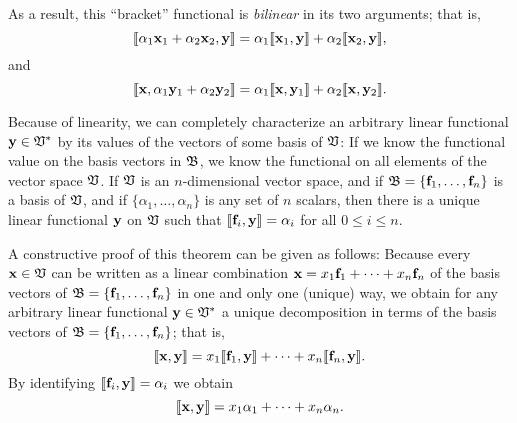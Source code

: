 As a result, this ``bracket'' functional is
{\em bilinear} in its two arguments; that is,
\begin{equation}
\llbracket  \alpha_1 {\bf x}_1 +\alpha_2 {\bf x}_2, {\bf y}\rrbracket
=
\alpha_1 \llbracket {\bf x}_1 ,{\bf y}\rrbracket   +\alpha_2  \llbracket {\bf x}_2,{\bf y}\rrbracket ,
\end{equation}
and
\begin{equation}
\llbracket
{\bf x}, \alpha_1 {\bf y}_1 +\alpha_2 {\bf y}_2
\rrbracket
=
\alpha_1
\llbracket {\bf x},{\bf y}_1 \rrbracket
+
\alpha_2
\llbracket {\bf x},{\bf y}_2\rrbracket .
\end{equation}


Because of linearity, we can completely characterize an arbitrary linear functional
${\bf y} \in {\frak V}^\ast $ by its values of the vectors of some basis of ${\frak V}$:
If we know the functional value on the basis vectors in ${\frak B}$, we know the functional
on all elements of the vector space ${\frak V}$.
If ${\frak V}$ is an $n$-dimensional vector space, and if ${\frak B} = \{{\bf f}_1,\ldots , {\bf f}_n\}$
is a basis of  ${\frak V}$, and if
$\{\alpha_1, \ldots ,\alpha_n\}$  is any set of $n$ scalars, then there is
a unique linear functional ${\bf y}$  on  ${\frak V}$ such that
$ \llbracket  {\bf f}_i, {\bf y}\rrbracket  = \alpha_i $ for all $0\le i \le n$.

{\color{OliveGreen}
\bproof
A constructive proof  of this theorem can be given as follows:
Because every ${\bf x}\in {\frak V}$
can be written as a linear combination $ {\bf x} = x_1 {\bf f}_1 +\cdots + x_n {\bf f}_n$
of the basis vectors of ${\frak B} = \{{\bf f}_1,\ldots , {\bf f}_n\}$
in one and only one (unique) way, we obtain for any arbitrary linear functional ${\bf y} \in {\frak V}^\ast $  a unique decomposition
in terms of the basis vectors of  ${\frak B} = \{{\bf f}_1,\ldots , {\bf f}_n\}$; that is,
\begin{equation}
\llbracket {\bf x},{\bf y}\rrbracket
=
x_1 \llbracket {\bf f}_1 ,{\bf y}\rrbracket  +\cdots + x_n \llbracket {\bf f}_n ,{\bf y}\rrbracket  .
\end{equation}
By identifying  $\llbracket {\bf f}_i ,{\bf y}\rrbracket =\alpha_i$ we obtain
\begin{equation}
\llbracket {\bf x},{\bf y}\rrbracket
=
x_1 \alpha_1 +\cdots + x_n \alpha_n .
\end{equation}
\eproof
}

